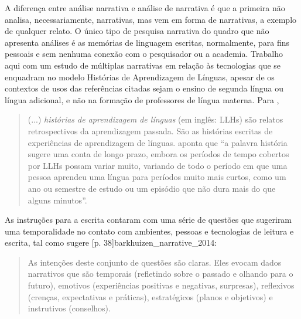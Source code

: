 \documentclass{textolivre}
\begin{document}
A diferença entre análise narrativa e análise de narrativa é que a primeira não analisa, necessariamente, narrativas, mas vem em forma de narrativas, a exemplo de qualquer relato. O único tipo de pesquisa narrativa do quadro que não apresenta análises é as memórias de linguagem escritas, normalmente, para fins pessoais e sem nenhuma conexão com o pesquisador ou a academia. Trabalho aqui com um estudo de múltiplas narrativas em relação às tecnologias que se enquadram no modelo Histórias de Aprendizagem de Línguas, apesar de os contextos de usos das referências citadas sejam o ensino de segunda língua ou língua adicional, e não na formação de professores de língua materna. Para \textcite[p. 37]{barkhuizen_narrative_2014},

\begin{quote}
    (...) \textit{histórias de aprendizagem de línguas} (em inglês: LLHs) são relatos retrospectivos da aprendizagem passada. São as histórias escritas de experiências de aprendizagem de línguas. \textcite[p. 548]{benson_language_2011} aponta que “a palavra história sugere uma conta de longo prazo, embora os períodos de tempo cobertos por LLHs possam variar muito, variando de todo o período em que uma pessoa aprendeu uma língua para períodos muito mais curtos, como um ano ou semestre de estudo ou um episódio que não dura mais do que alguns minutos”.
\end{quote}

As instruções para a escrita contaram com uma série de questões que sugeriram uma temporalidade no contato com ambientes, pessoas e tecnologias de leitura e escrita, tal como sugere [p. 38]{barkhuizen_narrative_2014}:

\begin{quote}
    As intenções deste conjunto de questões são claras. Eles evocam dados narrativos que são temporais (refletindo sobre o passado e olhando para o futuro), emotivos (experiências positivas e negativas, surpresas), reflexivos (crenças, expectativas e práticas), estratégicos (planos e objetivos) e instrutivos (conselhos).
\end{quote}
\end{document}
